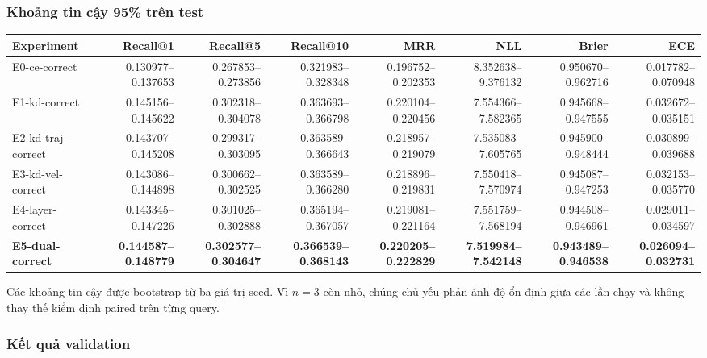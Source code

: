 \subsubsection*{Khoảng tin cậy 95\% trên test}

\begin{table}[!htbp]
\centering
\scriptsize
\setlength{\tabcolsep}{2.5pt}
\begin{adjustbox}{max width=\textwidth}
\begin{tabular}{@{}lrrrrrrr@{}}
\toprule
Experiment & Recall@1 & Recall@5 & Recall@10 & MRR & NLL & Brier & ECE \\
\midrule
E0-ce-correct & 0.130977--0.137653 & 0.267853--0.273856 & 0.321983--0.328348 & 0.196752--0.202353 & 8.352638--9.376132 & 0.950670--0.962716 & 0.017782--0.070948 \\
E1-kd-correct & 0.145156--0.145622 & 0.302318--0.304078 & 0.363693--0.366798 & 0.220104--0.220456 & 7.554366--7.582365 & 0.945668--0.947555 & 0.032672--0.035151 \\
E2-kd-traj-correct & 0.143707--0.145208 & 0.299317--0.303095 & 0.363589--0.366643 & 0.218957--0.219079 & 7.535083--7.605765 & 0.945900--0.948444 & 0.030899--0.039688 \\
E3-kd-vel-correct & 0.143086--0.144898 & 0.300662--0.302525 & 0.363589--0.366280 & 0.218896--0.219831 & 7.550418--7.570974 & 0.945087--0.947253 & 0.032153--0.035770 \\
E4-layer-correct & 0.143345--0.147226 & 0.301025--0.302888 & 0.365194--0.367057 & 0.219081--0.221164 & 7.551759--7.568194 & 0.944508--0.946961 & 0.029011--0.034597 \\
\textbf{E5-dual-correct} & \textbf{0.144587--0.148779} & \textbf{0.302577--0.304647} & \textbf{0.366539--0.368143} & \textbf{0.220205--0.222829} & \textbf{7.519984--7.542148} & \textbf{0.943489--0.946538} & \textbf{0.026094--0.032731} \\
\bottomrule
\end{tabular}
\end{adjustbox}
\end{table}

Các khoảng tin cậy được bootstrap từ ba giá trị seed. Vì $n=3$ còn nhỏ, chúng chủ yếu phản ánh độ ổn định giữa các lần chạy và không thay thế kiểm định paired trên từng query.

\subsubsection*{Kết quả validation}

